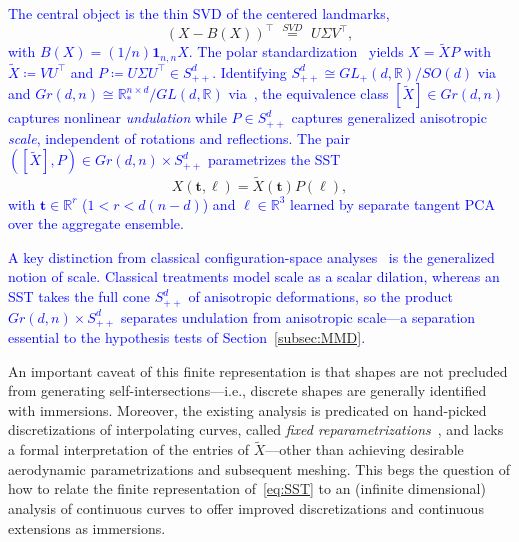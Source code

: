 \documentclass[pdflatex,iicol]{sn-jnl}%
\theoremstyle{thmstyleone}%
\theoremstyle{thmstyletwo}%
\theoremstyle{thmstylethree}%
\begin{document}
\textcolor{blue}{The central object is the thin SVD of the centered landmarks,}
\begin{equation} \label{eq:landmark_stnd}
    (X - B(X))^{\top} \,\,\overset{SVD}{=}\,\, U\Sigma V^{\top},
\end{equation}
\textcolor{blue}{with $B(X) = (1/n)\boldsymbol{1}_{n,n}X$. The polar standardization~\cite{grey2023separable} yields $X = \widetilde{X}P$ with $\widetilde{X} \coloneqq VU^{\top}$ and $P \coloneqq U\Sigma U^{\top}\in S^d_{++}$. Identifying $S^d_{++} \cong GL_+(d,\mathbb{R})/SO(d)$ via~\cite{fletcher2003statistics} and $Gr(d,n)\cong \mathbb{R}^{n\times d}_*/GL(d,\mathbb{R})$ via~\cite{absil2008optimization}, the equivalence class $[\widetilde{X}]\in Gr(d,n)$ captures nonlinear \emph{undulation} while $P\in S^d_{++}$ captures generalized anisotropic \emph{scale}, independent of rotations and reflections. The pair $([\widetilde{X}],P)\in Gr(d,n)\times S^d_{++}$ parametrizes the SST}
\begin{equation}\label{eq:SST}
    X(\boldsymbol{t},\boldsymbol{\ell}) = \widetilde{X}(\boldsymbol{t})P(\boldsymbol{\ell}),
\end{equation}
\textcolor{blue}{with $\boldsymbol{t} \in \mathbb{R}^r$ ($1< r < d(n-d)$) and $\boldsymbol{\ell}\in \mathbb{R}^3$ learned by separate tangent PCA~\cite{fletcher2004principal, edelman1998geometry, grey2023separable} over the aggregate ensemble.}

\textcolor{blue}{A key distinction from classical configuration-space analyses~\cite{kendall2009shape,srivastava2010shape,srivastava2016functional} is the generalized notion of scale. Classical treatments model scale as a scalar dilation, whereas an SST takes the full cone $S^d_{++}$ of anisotropic deformations, so the product $Gr(d,n)\times S^d_{++}$ separates undulation from anisotropic scale---a separation essential to the hypothesis tests of Section~\ref{subsec:MMD}.}

An important caveat of this finite representation is that shapes are not precluded from generating self-intersections---i.e., discrete shapes are generally identified with immersions. Moreover, the existing analysis is predicated on hand-picked discretizations of interpolating curves, called \emph{fixed reparametrizations}~\cite{grey2023separable}, and lacks a formal interpretation of the entries of $\widetilde{X}$---other than achieving desirable aerodynamic parametrizations and subsequent meshing. This begs the question of how to relate the finite representation of~\eqref{eq:SST} to an (infinite dimensional) analysis of continuous curves to offer improved discretizations and continuous extensions as immersions.
\end{document}
